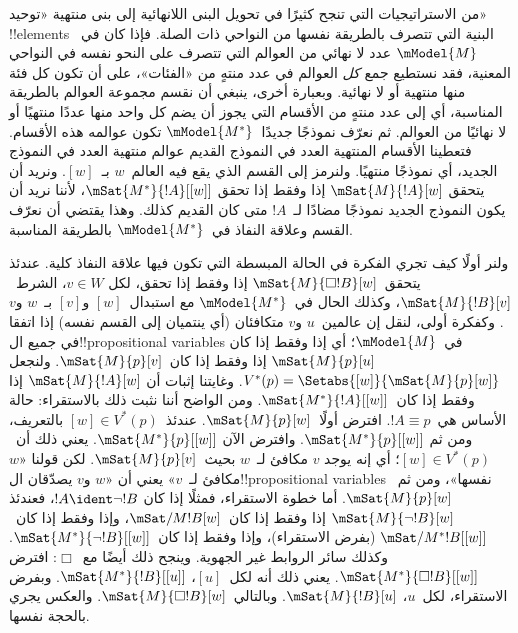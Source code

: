 \documentclass[../../../include/open-logic-section]{subfiles}
\begin{document}
من الاستراتيجيات التي تنجح كثيرًا في تحويل البنى اللانهائية إلى بنى منتهية
«توحيد» !!{element}s البنية التي تتصرف بالطريقة نفسها من النواحي ذات
الصلة. فإذا كان في~$\mModel{M}$ عدد لا نهائي من العوالم التي تتصرف على
النحو نفسه في النواحي المعنية، فقد نستطيع جمع \emph{كل} العوالم في عدد
منتهٍ من «الفئات»، على أن تكون كل فئة منها منتهية أو لا نهائية. وبعبارة
أخرى، ينبغي أن نقسم مجموعة العوالم بالطريقة المناسبة، أي إلى عدد منتهٍ من
الأقسام التي يجوز أن يضم كل واحد منها عددًا منتهيًا أو لا نهائيًا من
العوالم. ثم نعرّف نموذجًا جديدًا~$\mModel{M^*}$ تكون عوالمه هذه الأقسام.
فتعطينا الأقسام المنتهية العدد في النموذج القديم عوالم منتهية العدد في
النموذج الجديد، أي نموذجًا منتهيًا. ولنرمز إلى القسم الذي يقع فيه
العالم~$w$ بـ~$[w]$. ونريد أن يتحقق
$\mSat{M}{!A}[w]$ إذا وفقط إذا تحقق
$\mSat{M^*}{!A}[{[w]}]$، لأننا نريد أن يكون النموذج الجديد نموذجًا
مضادًا لـ~$!A$ متى كان القديم كذلك. وهذا يقتضي أن نعرّف القسم وعلاقة
النفاذ في~$\mModel{M^*}$ بالطريقة المناسبة.

ولنر أولًا كيف تجري الفكرة في الحالة المبسطة التي تكون فيها علاقة النفاذ
كلية. عندئذ يتحقق~$\mSat{M}{\Box !B}[w]$ إذا وفقط إذا تحقق، لكل
$v \in W$، الشرط~$\mSat{M}{!B}[v]$، وكذلك الحال في~$\mModel{M^*}$ مع
استبدال~$[w]$ و$[v]$ بـ~$w$ و$v$. وكفكرة أولى، لنقل إن عالمين~$u$
و$v$ متكافئان (أي ينتميان إلى القسم نفسه) إذا اتفقا في جميع
ال!!{propositional variable}s في~$\mModel{M}$؛ أي إذا وفقط إذا كان
$\mSat{M}{p}[u]$ إذا وفقط إذا كان~$\mSat{M}{p}[v]$. ولنجعل
$V^*(p)=\Setabs{[w]}{\mSat{M}{p}[w]}$. وغايتنا إثبات أن
$\mSat{M}{!A}[w]$ إذا وفقط إذا كان~$\mSat{M^*}{!A}[{[w]}]$.
ومن الواضح أننا نثبت ذلك بالاستقراء: حالة الأساس هي~$!A \equiv p$.
افترض أولًا~$\mSat{M}{p}[w]$. عندئذ~$[w] \in V^*(p)$ بالتعريف، ومن ثم
$\mSat{M^*}{p}[{[w]}]$. وافترض الآن
$\mSat{M^*}{p}[{[w]}]$. يعني ذلك أن~$[w] \in V^*(p)$؛ أي إنه يوجد
$v$ مكافئ لـ~$w$ بحيث~$\mSat{M}{p}[v]$. لكن قولنا «$w$ مكافئ
لـ~$v$» يعني أن «$w$ و$v$ يصدّقان ال!!{propositional variable}s
نفسها»، ومن ثم~$\mSat{M}{p}[w]$. أما خطوة الاستقراء، فمثلًا إذا كان
$!A \ident \lnot !B$، فعندئذ
$\mSat{M}{\lnot !B}[w]$ إذا وفقط إذا كان~$\mSat/{M}{!B}[w]$، وإذا
وفقط إذا كان~$\mSat/{M^*}{!B}[{[w]}]$ (بفرض الاستقراء)، وإذا وفقط
إذا كان~$\mSat{M^*}{\lnot !B}[{[w]}]$. وكذلك سائر الروابط غير
الجهوية. وينجح ذلك أيضًا مع~$\Box$: افترض
$\mSat{M^*}{\Box !B}[{[w]}]$. يعني ذلك أنه لكل~$[u]$،
$\mSat{M^*}{!B}[{[u]}]$. وبفرض الاستقراء، لكل~$u$،
$\mSat{M}{!B}[u]$. وبالتالي~$\mSat{M}{\Box !B}[w]$. والعكس يجري
بالحجة نفسها.
\end{document}
